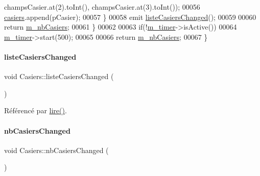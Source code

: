 \begin{DoxyCode}
      champsCasier.at(2).toInt(), champsCasier.at(3).toInt());
00056             \hyperlink{class_casiers_ad8fba25144a82ba49b2cd2490dcf975b}{casiers}.append(pCasier);
00057         \}
00058         emit \hyperlink{class_casiers_a25d7a8e09435cb7ee0b9f9e27e52b177}{listeCasiersChanged}();
00059 
00060         \textcolor{keywordflow}{return} \hyperlink{class_casiers_a7c4b1df1f2e320c22489234fee991f18}{m\_nbCasiers};
00061     \}
00062 
00063     \textcolor{keywordflow}{if}(!\hyperlink{class_casiers_a2e2ee8b7f70d1c22acca56257d257ae6}{m\_timer}->isActive())
00064         \hyperlink{class_casiers_a2e2ee8b7f70d1c22acca56257d257ae6}{m\_timer}->start(500);
00065 
00066     \textcolor{keywordflow}{return} \hyperlink{class_casiers_a7c4b1df1f2e320c22489234fee991f18}{m\_nbCasiers};
00067 \}
\end{DoxyCode}
\mbox{\label{class_casiers_a25d7a8e09435cb7ee0b9f9e27e52b177}} 
\paragraph{\texorpdfstring{liste\+Casiers\+Changed}{listeCasiersChanged}}
{\footnotesize\ttfamily void Casiers\+::liste\+Casiers\+Changed (\begin{DoxyParamCaption}{ }\end{DoxyParamCaption})\hspace{0.3cm}{\ttfamily [signal]}}



Référencé par \hyperlink{class_casiers_a7b1d58f40217ef13a5dd0d966df38c9a}{lire()}.

\mbox{\label{class_casiers_a73cd8be3085cb73651b4dea4d22a667b}} 
\paragraph{\texorpdfstring{nb\+Casiers\+Changed}{nbCasiersChanged}}
{\footnotesize\ttfamily void Casiers\+::nb\+Casiers\+Changed (\begin{DoxyParamCaption}{ }\end{DoxyParamCaption})\hspace{0.3cm}{\ttfamily [signal]}}



